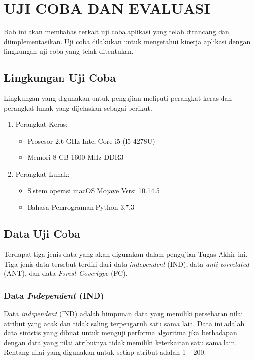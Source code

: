 \chapter{UJI COBA DAN EVALUASI}\label{chap:uji-coba-eval}

\tab Bab ini akan membahas terkait uji coba aplikasi yang telah dirancang dan diimplementasikan. Uji coba dilakukan untuk mengetahui kinerja aplikasi dengan lingkungan uji coba yang telah ditentukan.

\section{Lingkungan Uji Coba}
\tab Lingkungan yang digunakan untuk pengujian meliputi perangkat keras dan
perangkat lunak yang dijelaskan sebagai berikut.

\begin{enumerate}
	\item Perangkat Keras:
	\begin{itemize}
		\item Prosesor 2.6 GHz Intel Core i5 (I5-4278U)
		\item Memori 8 GB 1600 MHz DDR3
	\end{itemize}
	\item Perangkat Lunak:
	\begin{itemize}
		\item Sistem operasi macOS Mojave Versi 10.14.5
		\item Bahasa Pemrograman Python 3.7.3
	\end{itemize}			
\end{enumerate}

\section{Data Uji Coba}

\tab Terdapat tiga jenis data yang akan digunakan dalam pengujian Tugas Akhir ini. Tiga jenis data tersebut terdiri dari data \textit{independent} (IND), data \textit{anti-correlated} (ANT), dan data \textit{Forest-Covertype} (FC).

\subsection{Data \textit{Independent} (IND)}
\tab Data \textit{independent} (IND) adalah himpunan data yang memiliki persebaran nilai atribut yang acak dan tidak saling terpengaruh satu sama lain. Data ini adalah data sintetis yang dibuat untuk menguji performa algoritma jika berhadapan dengan data yang nilai atributnya tidak memiliki keterkaitan satu sama lain. Rentang nilai yang digunakan untuk setiap atribut adalah 1 – 200.


